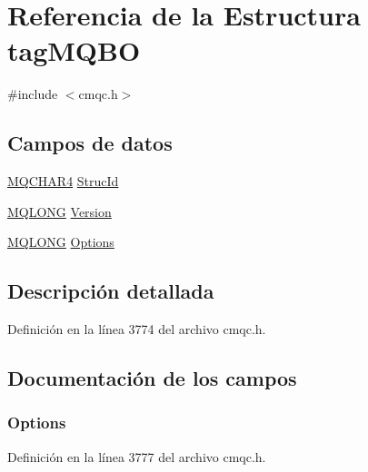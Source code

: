 \hypertarget{structtag_m_q_b_o}{}\section{Referencia de la Estructura tag\+M\+Q\+B\+O}
\label{structtag_m_q_b_o}


{\ttfamily \#include $<$cmqc.\+h$>$}

\subsection*{Campos de datos}
\begin{DoxyCompactItemize}
\item 
\hyperlink{cmqc_8h_a12590e546ed66fda7cf21c1d5cefa31d}{M\+Q\+C\+H\+A\+R4} \hyperlink{structtag_m_q_b_o_a0530922ca944569b52601d74941f96e4}{Struc\+Id}
\item 
\hyperlink{cmqc_8h_a1fb8d28cbda3fa8766a9821230cdb6d5}{M\+Q\+L\+O\+N\+G} \hyperlink{structtag_m_q_b_o_a0656ef8f766b3907d394d88a35d7b7e9}{Version}
\item 
\hyperlink{cmqc_8h_a1fb8d28cbda3fa8766a9821230cdb6d5}{M\+Q\+L\+O\+N\+G} \hyperlink{structtag_m_q_b_o_ad7aff2d6c6044809464380998d24ec5c}{Options}
\end{DoxyCompactItemize}


\subsection{Descripción detallada}


Definición en la línea 3774 del archivo cmqc.\+h.



\subsection{Documentación de los campos}
\hypertarget{structtag_m_q_b_o_ad7aff2d6c6044809464380998d24ec5c}{}
\subsubsection[{Options}]{ Options}\label{structtag_m_q_b_o_ad7aff2d6c6044809464380998d24ec5c}


Definición en la línea 3777 del archivo cmqc.\+h.

\hypertarget{structtag_m_q_b_o_a0530922ca944569b52601d74941f96e4}{}
